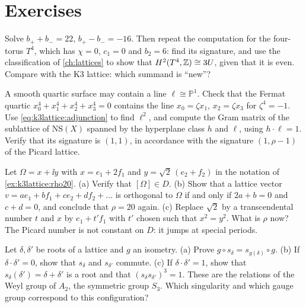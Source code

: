 \section*{Exercises}

\begin{exercise}[$\star$]\label{ex:k3lattice:exsig}
Solve $b_++b_-=22$, $b_+-b_-=-16$. Then repeat the computation for the four-torus $T^4$,
which has $\chi=0$, $c_1=0$ and $b_2=6$: find its signature, and use the classification of
\cref{ch:lattices} to show that $H^2(T^4,\mathbb{Z})\cong3U$, given that it is even. Compare with the
K3 lattice: which summand is ``new''?
\end{exercise}

\begin{exercise}[$\star$]
A smooth quartic surface may contain a line $\ell\cong\mathbb P^1$. Check that the Fermat
quartic $x_0^4+x_1^4+x_2^4+x_3^4=0$ contains the line $x_0=\zeta x_1$, $x_2=\zeta x_3$ for
$\zeta^4=-1$. Use \eqref{eq:k3lattice:adjunction} to find
$\ell^2$, and compute the Gram matrix of the sublattice of $\mathrm{NS}(X)$ spanned by the
hyperplane class $h$ and $\ell$, using $h\cdot\ell=1$. Verify that its signature is $(1,1)$,
in accordance with the signature $(1,\rho-1)$ of the Picard lattice.
\end{exercise}

\begin{exercise}[$\star\star$]
Let $\Omega=x+\ii y$ with $x=e_1+2f_1$ and $y=\sqrt2\,(e_2+f_2)$ in the notation of
\cref{ex:k3lattice:rho20}. (a) Verify that $[\Omega]\in D$. (b) Show that a lattice vector
$v=ae_1+bf_1+ce_2+df_2+\dots$ is orthogonal to $\Omega$ if and only if $2a+b=0$ and $c+d=0$,
and conclude that $\rho=20$ again. (c) Replace $\sqrt2$ by a transcendental number $t$ and
$x$ by $e_1+t'f_1$ with $t'$ chosen such that $x^2=y^2$. What is $\rho$ now? The Picard number is not constant on $D$: it jumps at special periods.
\end{exercise}

\begin{exercise}[$\star\star$]
Let $\delta,\delta'$ be roots of a lattice and $g$ an isometry. (a) Prove
$g\circ s_\delta=s_{g(\delta)}\circ g$. (b) If $\delta\cdot\delta'=0$, show that $s_\delta$
and $s_{\delta'}$ commute. (c) If $\delta\cdot\delta'=1$, show that $s_\delta(\delta')
=\delta+\delta'$ is a root and that $(s_\delta s_{\delta'})^3=1$. These are the relations of
the Weyl group of $A_2$, the symmetric group $S_3$. Which singularity and which gauge group
correspond to this configuration?
\end{exercise}

